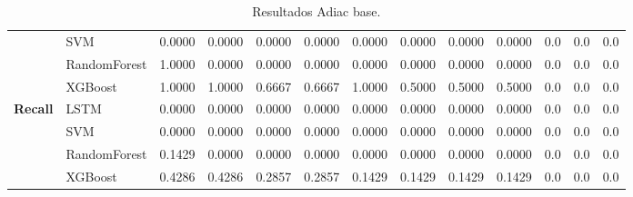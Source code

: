 \begin{table}[h]
\begin{adjustbox}{max width=15cm}
\begin{tabular}{|c|l|r|r|r|r|r|r|r|r|r|r|r|}
			& SVM &  0.0000 &  0.0000 &  0.0000 &  0.0000 &  0.0000 &  0.0000 &  0.0000 &  0.0000 &  0.0 &  0.0 &  0.0 \\
			& RandomForest &  1.0000 &  0.0000 &  0.0000 &  0.0000 &  0.0000 &  0.0000 &  0.0000 &  0.0000 &  0.0 &  0.0 &  0.0 \\
			& XGBoost &  1.0000 &  1.0000 &  0.6667 &  0.6667 &  1.0000 &  0.5000 &  0.5000 &  0.5000 &  0.0 &  0.0 &  0.0 \\
			\hline
			\textbf{Recall} & LSTM &  0.0000 &  0.0000 &  0.0000 &  0.0000 &  0.0000 &  0.0000 &  0.0000 &  0.0000 &  0.0 &  0.0 &  0.0 \\
			& SVM &  0.0000 &  0.0000 &  0.0000 &  0.0000 &  0.0000 &  0.0000 &  0.0000 &  0.0000 &  0.0 &  0.0 &  0.0 \\
			& RandomForest &  0.1429 &  0.0000 &  0.0000 &  0.0000 &  0.0000 &  0.0000 &  0.0000 &  0.0000 &  0.0 &  0.0 &  0.0 \\
			& XGBoost &  0.4286 &  0.4286 &  0.2857 &  0.2857 &  0.1429 &  0.1429 &  0.1429 &  0.1429 &  0.0 &  0.0 &  0.0 \\
			\hline
		\end{tabular}
	\end{adjustbox}
	\caption{Resultados Adiac base.}
	\label{tab:Adiac_base}
\end{table}
